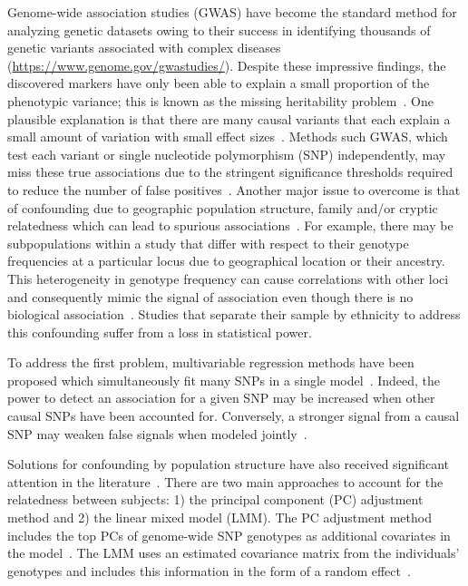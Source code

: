 \documentclass[12pt,letter]{article}\usepackage[]{graphicx}\usepackage[]{color}
\begin{document}
Genome-wide association studies (GWAS) have become the standard method for analyzing genetic datasets owing to their success in identifying thousands of genetic variants associated with complex diseases (\url{https://www.genome.gov/gwastudies/}).
Despite these impressive findings, the discovered markers have only been able to explain a small proportion of the phenotypic variance; this is known as the missing heritability problem~\citep{manolio2009finding}.
One plausible explanation is that there are many causal variants that each explain a small amount of variation with small effect sizes~\citep{yang2010common}.
Methods such GWAS, which test each variant or single nucleotide polymorphism (SNP) independently, may miss these true associations due to the stringent significance thresholds required to reduce the number of false positives~\citep{manolio2009finding}.
Another major issue to overcome is that of confounding due to geographic population structure, family and/or cryptic relatedness which can lead to spurious associations~\citep{astle2009population}.
For example, there may be subpopulations within a study that differ with respect to their genotype frequencies at a particular locus due to geographical location or their ancestry.
This heterogeneity in genotype frequency can cause correlations with other loci and consequently mimic the signal of association even though there is no biological association~\citep{song2015testing,marchini2004effects}.
Studies that separate their sample by ethnicity to address this confounding suffer from a loss in statistical power.


To address the first problem, multivariable regression methods have been proposed which simultaneously fit many SNPs in a single model~\citep{hoggart2008simultaneous,li2010bayesian}. Indeed, the power to detect an association for a given SNP may be increased when other causal SNPs have been accounted for. Conversely, a stronger signal from a causal SNP may weaken false signals when modeled jointly~\citep{hoggart2008simultaneous}.

Solutions for confounding by population structure have also received significant attention in the literature~\citep{lippert2011fast,kang2010variance,yu2006unified,eu2014comparison}.
There are two main approaches to account for the relatedness between subjects: 1) the principal component (PC) adjustment method and 2) the linear mixed model (LMM).
The PC adjustment method includes the top PCs of genome-wide SNP genotypes as additional covariates in the model~\citep{price2006principal}.
The LMM uses an estimated covariance matrix from the individuals' genotypes and includes this information in the form of a random effect~\cite{astle2009population}.
\end{document}
